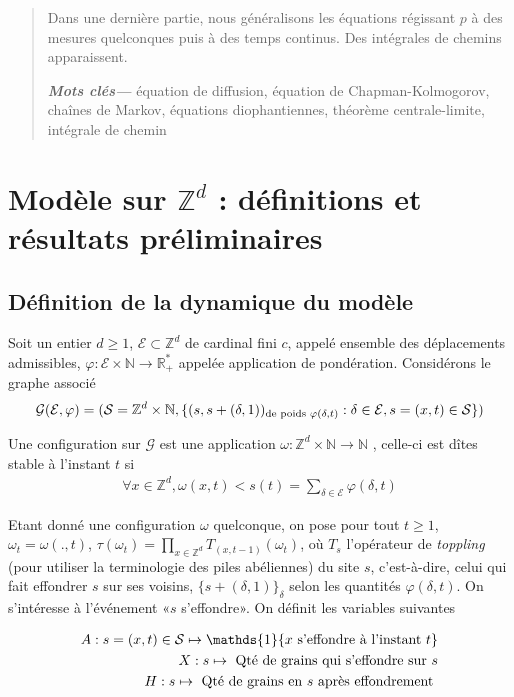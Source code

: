 \documentclass{article}
\providecommand{\keywords}[1]
{
  \small
  \textbf{\textit{Mots clés---}} #1
}
\begin{document}
\begin{abstract}

	Dans une dernière partie, nous généralisons les équations régissant $p$ à des mesures quelconques puis à des temps continus. Des intégrales de chemins apparaissent.

	\keywords{équation de diffusion, équation de Chapman-Kolmogorov, chaînes de Markov, équations diophantiennes, théorème centrale-limite, intégrale de chemin}
\end{abstract}
\newpage 
\section{Modèle sur $\mathbb{Z}^d$ : définitions et résultats préliminaires}
\subsection{Définition de la dynamique du modèle}
Soit un entier $d \geq 1$, $\mathcal{E}\subset\mathbb{Z}^d$ de cardinal fini $c$, appelé ensemble des déplacements admissibles, $\varphi : \mathcal{E}\times\mathbb{N}\to \mathbb{R}^*_+$ appelée application de pondération. Considérons le graphe associé 
\begin{align*}
	\mathcal{G}(\mathcal{E},\varphi) = (\mathcal{S} = \mathbb{Z}^d\times\mathbb{N}, \{(s,s+(\delta,1))_{\textup{de poids } \varphi(\delta,t)} : \delta\in \mathcal{E}, s=(x,t)\in \mathcal{S}\})
\end{align*}

Une configuration sur $\mathcal{G}$ est une application $\omega : \mathbb{Z}^d\times\mathbb{N}\to \mathbb{N}$ , celle-ci est dîtes stable à l'instant $t$ si
\begin{align*}
	\forall x\in\mathbb{Z}^d, \omega(x,t)<s(t) = \sum_{\delta\in \mathcal{E}}\varphi(\delta,t)
\end{align*}

Etant donné une configuration $\omega$ quelconque, on pose pour tout $t\geq 1$, $\omega_t = \omega(.,t)$, $\tau(\omega_t) = \prod_{x\in \mathbb{Z}^d} T_{(x,t-1)} (\omega_t)$, où $T_s$ l'opérateur de \textit{toppling} (pour utiliser la terminologie des piles abéliennes) du site $s$, c'est-à-dire, celui qui fait effondrer $s$ sur ses voisins, $\{s+(\delta, 1)\}_{\delta}$ selon les quantités $\varphi(\delta,t)$. On s'intéresse à l'événement «$s$ s'effondre». On définit les variables suivantes

\begin{align*}
	A : s = (x,t)\in\mathcal{S} \mapsto \mathds{1}\{x\textup{ s'effondre à l'instant } t\}\\
	X : s \mapsto \textup{ Qté de grains qui s'effondre sur } s\\
	H : s \mapsto \textup{ Qté de grains en } s \textup{ après effondrement }
\end{align*}
\end{document}
